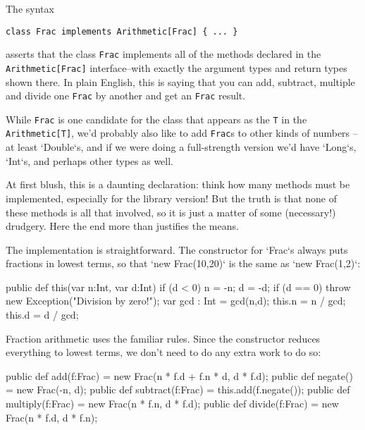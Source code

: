 The syntax 
\begin{verbatim}
class Frac implements Arithmetic[Frac] { ... }
\end{verbatim}
asserts that the class {\tt Frac} implements all of the methods 
declared in the {\tt Arith\-me\-tic[Frac]} interface--with exactly the 
argument types and return types shown there.
In plain English, this is saying that you can add, subtract, multiple and divide one
{\tt Frac} by another and get an {\tt Frac} result.


While {\tt Frac} is one candidate for the class that
appears as the {\tt T} in the {\tt Arithmetic[T]}, we'd probably also like to
add {\tt Frac}s to other kinds of numbers -- at least \xcd`Double`s, and if we
were doing a full-strength version we'd have \xcd`Long`s, \xcd`Int`s, and
perhaps other types as well.  


\begin{xtennum}[]
class Frac implements Arithmetic[Frac], 
                      Arithmetic[Double] 
{
\end{xtennum}



At first blush, this is a daunting declaration: think how many methods must be
implemented, especially for the library version!
But the truth is that none of these methods is all that involved, so it is just a matter of
some (necessary!) drudgery.  Here the end more than justifies the means.

The implementation is straightforward.  The constructor for
\xcd`Frac`s always puts fractions in lowest terms, so that 
\xcd`new Frac(10,20)` is the same as  \xcd`new Frac(1,2)`: 

\begin{xtennum}[]
  public def this(var n:Int, var d:Int) {
    if (d < 0) { n = -n; d = -d; }
    if (d == 0) throw new Exception("Division by zero!");
    var gcd : Int = gcd(n,d);
    this.n = n / gcd;
    this.d = d / gcd;
  }
\end{xtennum}

Fraction arithmetic uses the familiar rules.  Since the constructor reduces
everything to lowest terms, we don't need to do any extra work to do so: 

\begin{xtennum}[]
  
  public def add(f:Frac) = new Frac(n * f.d + f.n * d, d * f.d);
  public def negate() = new Frac(-n, d);
  public def subtract(f:Frac) = this.add(f.negate());
  public def multiply(f:Frac) = new Frac(n * f.n, d * f.d);
  public def divide(f:Frac) = new Frac(n * f.d, d * f.n);  
  
\end{xtennum}

